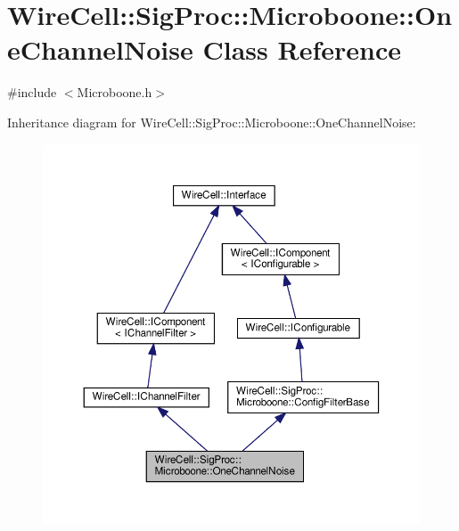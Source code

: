 \hypertarget{class_wire_cell_1_1_sig_proc_1_1_microboone_1_1_one_channel_noise}{}\section{Wire\+Cell\+:\+:Sig\+Proc\+:\+:Microboone\+:\+:One\+Channel\+Noise Class Reference}
\label{class_wire_cell_1_1_sig_proc_1_1_microboone_1_1_one_channel_noise}


{\ttfamily \#include $<$Microboone.\+h$>$}



Inheritance diagram for Wire\+Cell\+:\+:Sig\+Proc\+:\+:Microboone\+:\+:One\+Channel\+Noise\+:
\nopagebreak
\begin{figure}[H]
\begin{center}
\leavevmode
\includegraphics[width=350pt]{class_wire_cell_1_1_sig_proc_1_1_microboone_1_1_one_channel_noise__inherit__graph}
\end{center}
\end{figure}


